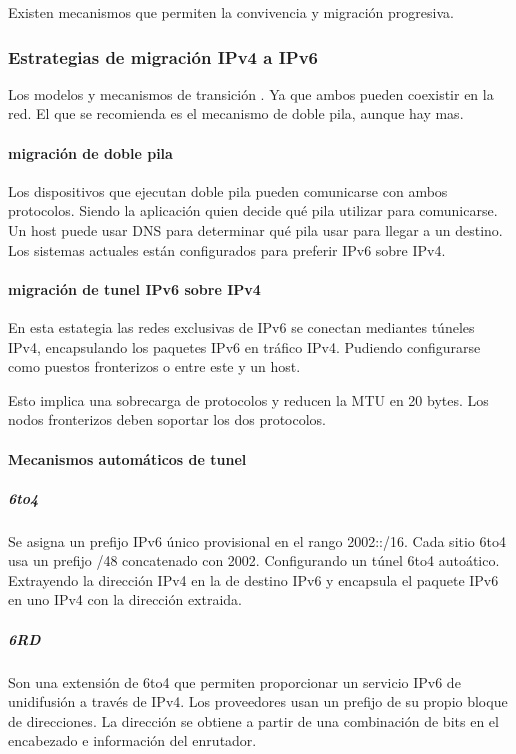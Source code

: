     Existen mecanismos que permiten la convivencia y migración progresiva.

    \subsubsection{Estrategias de migración IPv4 a IPv6} %
        Los modelos y mecanismos de transición . Ya que ambos pueden coexistir en la red. El que se recomienda es el mecanismo de doble pila, aunque hay mas.

        \paragraph{migración de doble pila} %
            Los dispositivos que ejecutan doble pila pueden comunicarse con ambos protocolos. Siendo la aplicación quien decide qué pila utilizar para comunicarse. Un host puede usar DNS para determinar qué pila usar para llegar a un destino. Los sistemas actuales están configurados para preferir IPv6 sobre IPv4.

        \paragraph{migración de tunel IPv6 sobre IPv4} %
            En esta estategia las redes exclusivas de IPv6 se conectan mediantes túneles IPv4, encapsulando los paquetes IPv6 en tráfico IPv4. Pudiendo configurarse como puestos fronterizos  o entre este y un host.

            Esto implica una sobrecarga de protocolos y reducen la MTU en 20 bytes. Los nodos fronterizos deben soportar los dos protocolos. 
        \paragraph{Mecanismos automáticos de tunel} %
            \subparagraph{6to4} %
                Se asigna un prefijo IPv6 único provisional en el rango 2002::/16. Cada sitio 6to4 usa un prefijo /48 concatenado con 2002. Configurando un túnel 6to4 autoático. Extrayendo la dirección IPv4 en la de destino IPv6 y encapsula el paquete IPv6 en uno IPv4 con la dirección extraida.

            \subparagraph{6RD} %
                Son una extensión de 6to4 que permiten proporcionar un servicio IPv6 de unidifusión a través de IPv4. Los proveedores usan un prefijo de su propio bloque de direcciones. La dirección se obtiene a partir de una combinación de bits en el encabezado e información del enrutador. 

